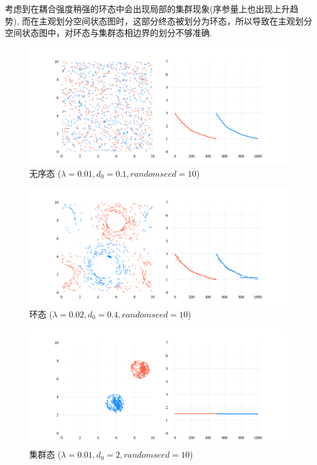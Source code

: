 \documentclass{article}
\begin{document}
 考虑到在耦合强度稍强的环态中会出现局部的集群现象(序参量上也出现上升趋势), 而在主观划分空间状态图时，这部分终态被划分为环态，所以导致在主观划分空间状态图中，对环态与集群态相边界的划分不够准确.

\newpage
\begin{figure}[H]
	\centering
	\includegraphics[width=\textwidth]{./figs/CorrectCoupling_uniform_0.010_0.10_10_radius.png}
	\vspace{-1cm}
	\caption{无序态 ($\lambda=0.01, d_0=0.1, random seed=10$)}
	\label{fig:fig22.1}
\end{figure}

\vspace{-1cm}

\begin{figure}[H]
	\centering
	\includegraphics[width=\textwidth]{./figs/CorrectCoupling_uniform_0.020_0.40_10_radius.png}
	\vspace{-1cm}
	\caption{环态 ($\lambda=0.02, d_0=0.4, random seed=10$)}
	\label{fig:fig22.2}
\end{figure}

\vspace{-1cm}

\begin{figure}[H]
	\centering
	\includegraphics[width=\textwidth]{./figs/CorrectCoupling_uniform_0.010_2.00_10_radius.png}
	\vspace{-1cm}
	\caption{集群态 ($\lambda=0.01, d_0=2, random seed=10$)}
	\label{fig:fig22.3}
\end{figure}
\end{document}

